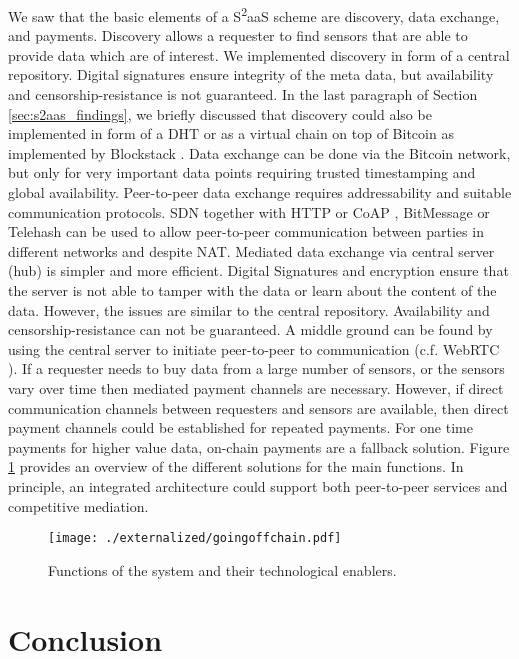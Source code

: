 We saw that the basic elements of a S\textsuperscript{2}aaS scheme are discovery, data exchange, and payments. Discovery allows a requester to find sensors that are able to provide data which are of interest. We implemented discovery in form of a central repository. Digital signatures ensure integrity of the meta data, but availability and censorship-resistance is not guaranteed. In the last paragraph of Section \ref{sec:s2aas_findings}, we briefly discussed that discovery could also be implemented in form of a \ac{DHT} or as a virtual chain on top of Bitcoin as implemented by Blockstack \parencite{ali2016blockstack}. Data exchange can be done via the Bitcoin network, but only for very important data points requiring trusted timestamping and global availability. Peer-to-peer data exchange requires addressability and suitable communication protocols. \ac{SDN} together with \ac{HTTP} or \ac{CoAP} \parencite{shelby2014constrained}, BitMessage \parencite{warren2012bitmessage} or Telehash can be used to allow peer-to-peer communication between parties in different networks and despite \ac{NAT}. Mediated data exchange via central server (hub) is simpler and more efficient. Digital Signatures and encryption ensure that the server is not able to tamper with the data or learn about the content of the data. However, the issues are similar to the central repository. Availability and censorship-resistance can not be guaranteed. A middle ground can be found by using the central server to initiate peer-to-peer to communication (c.f. WebRTC \parencite{bergkvist2012narayanan}). If a requester needs to buy data from a large number of sensors, or the sensors vary over time then mediated payment channels are necessary. However, if direct communication channels between requesters and sensors are available, then direct payment channels could be established for repeated payments. For one time payments for higher value data, on-chain payments are a fallback solution. Figure \ref{fig:conceptual_overview} provides an overview of the different solutions for the main functions. In principle, an integrated architecture could support both peer-to-peer services and competitive mediation. 

\begin{figure}
 \centering
 \texttt{[image: ./externalized/goingoffchain.pdf]}
 \caption{Functions of the system and their technological enablers.}
 \label{fig:conceptual_overview}
 \end{figure}


\section{Conclusion}
\label{sec:trust-lessconclusion}

